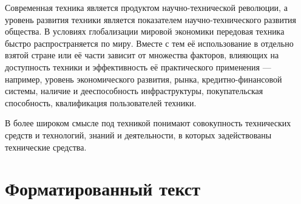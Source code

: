 \documentclass[a4paper, 14pt]{extarticle}
\begin{document}
Современная техника является продуктом научно-технической революции, а уровень развития техники является показателем научно-технического развития общества. В условиях глобализации мировой экономики передовая техника быстро распространяется по миру. Вместе с тем её использование в отдельно взятой стране или её части зависит от множества факторов, влияющих на доступность техники и эффективность её практического применения — например, уровень экономического развития, рынка, кредитно-финансовой системы, наличие и дееспособность инфраструктуры, покупательская способность, квалификация пользователей техники.

В более широком смысле под техникой понимают совокупность технических средств и технологий, знаний и деятельности, в которых задействованы технические средства. 

\section{Форматированный текст}
\end{document}
